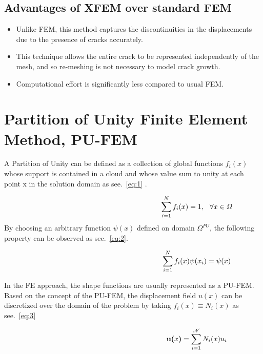 \documentclass[fleqn, 12.5pt,a4paper]{report}
\begin{document}
\subsection{Advantages of XFEM over standard FEM}
\begin{itemize}
    \item Unlike FEM, this method captures the discontinuities in the displacements due to the presence of cracks accurately\cite{khoei2014extended}.
    \item This technique allows the entire crack to be represented independently of the mesh, and so re-meshing is not necessary to model crack growth\cite{khoei2014extended}.
    \item Computational effort is significantly less compared to usual FEM.
\end{itemize}

\section{\large{Partition of Unity Finite Element Method, PU-FEM}}  
A Partition of Unity can be defined as a collection of global functions $f_i(x)$ whose support is contained in a cloud and whose value sum to unity at each point x in the solution domain as see.~\autoref{eq:1} \cite{ahmed2009extended}.

\begin{align}\label{eq:1}
\hspace{6.25cm}\sum_{i=1}^N f_i(x) = 1, \hspace{0.25cm} \forall {x\in \Omega} 
\end{align}
By choosing an arbitrary function $\psi(x)$ defined on domain $\Omega^{PU}$, the following property can be observed as\cite{khoei2014extended} see.~\autoref{eq:2}.

\begin{align}\label{eq:2}
\hspace{6.25cm}\sum_{i=1}^N f_i(x) \psi(x_i) = \psi(x)
\end{align}

In the FE approach, the shape functions are usually represented as a PU-FEM. Based on the concept of the PU-FEM, the displacement field $u(x)$ can be discretized over the domain of the problem \cite{khoei2014extended} by taking $f_i(x) \equiv N_i(x)$ as see.~\autoref{eq:3}

\begin{align}\label{eq:3}
\hspace{6.25cm}\textbf{u($x$)} = \sum_{i=1}^{\mathscr{N}} N_i(x) u_i
\end{align}
\end{document}
